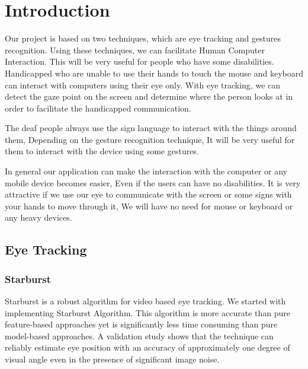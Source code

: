 \documentclass[12pt,fleqn]{book} %
\begin{document}
\chapter{Introduction}
Our project is based on two techniques, which are eye tracking and gestures recognition. Using these techniques, we can facilitate Human Computer Interaction. This will be very useful for people who have some disabilities. Handicapped who are unable to use their hands to touch the mouse and keyboard can interact with computers using their eye only. With eye tracking, we can detect the gaze point on the screen and determine where the person looks at in order to facilitate the handicapped communication.

The deaf people always use the sign language to interact with the things around them, Depending on the gesture recognition technique, It will be very useful for them to interact with the device using some gestures.

In general our application can make the interaction with the computer or any mobile device becomes easier, Even if the users can have no disabilities. It is very attractive if we use our eye to communicate with the screen or some signs with your hands to move through it, We will have no need for mouse or keyboard or any heavy devices.

\section{Eye Tracking}
\subsection{Starburst}
Starburst is a robust algorithm for video based eye tracking. We started with implementing Starburst Algorithm. This algorithm is more accurate than pure feature-based approaches yet is significantly less time consuming than pure model-based approaches. A validation study shows that the technique can reliably estimate eye position with an accuracy of approximately one degree of visual angle even in the presence of significant image noise. \bigskip
\end{document}
